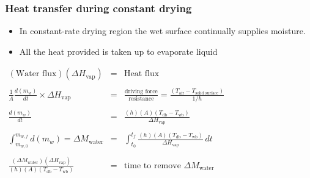 \begin{frame}\frametitle{Heat transfer during constant drying}
	\begin{itemize}
		\item	In constant-rate drying region the wet surface continually supplies moisture.
		\item	All the heat provided is taken up to evaporate liquid
	\end{itemize}
	\vspace{12pt}
	$\begin{array}{rcl}
		(\text{Water flux})(\Delta H_\text{vap})  							&=& \text{Heat flux}\\
		\\
		\displaystyle\frac{1}{A} \frac{d(m_w)}{dt} \times \Delta H_\text{vap} 	&=& \displaystyle\frac{\text{driving force}}{\text{resistance}} = \displaystyle\frac{(T_\text{air} - T_\text{solid surface}) }{1/h} \\
		\\
		\displaystyle \frac{d(m_w)}{dt}   										&=& \displaystyle\frac{(h)(A)(T_\text{db} - T_\text{wb})}{\Delta H_\text{vap}}  \\
		\\
		\displaystyle \int_{m_{w,0}}^{m_{w,f}}{d(m_w)} = \Delta M_\text{water}	&=& \displaystyle \int_{t_0}^{t_f}{\frac{(h)(A)(T_\text{db} - T_\text{wb})}{\Delta H_\text{vap}}\, dt} \\
		\\
		\displaystyle  \frac{(\Delta M_\text{water}) (\Delta H_\text{vap})}{(h)(A)(T_\text{db} - T_\text{wb})} &=& \text{time to remove $\Delta M_\text{water}$}
	\end{array}$
\end{frame}

